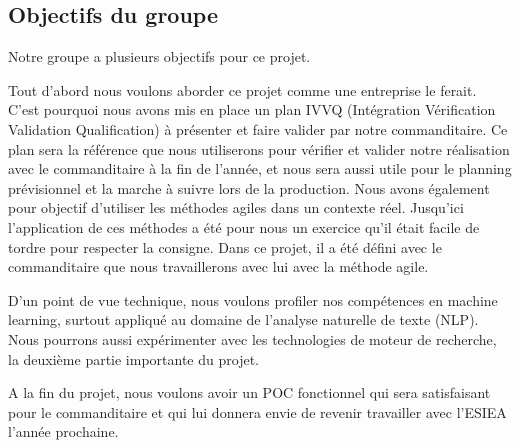 \subsection{Objectifs du groupe}
Notre groupe a plusieurs objectifs pour ce projet.

Tout d'abord nous voulons aborder ce projet comme une entreprise le ferait.
C'est pourquoi nous avons mis en place un plan IVVQ (Intégration Vérification Validation Qualification) à présenter et faire valider par notre commanditaire.
Ce plan sera la référence que nous utiliserons pour vérifier et valider notre réalisation avec le commanditaire à la fin de l'année, et nous sera aussi utile pour le planning prévisionnel et la marche à suivre lors de la production.
Nous avons également pour objectif d'utiliser les méthodes agiles dans un contexte réel.
Jusqu'ici l'application de ces méthodes a été pour nous un exercice qu'il était facile de tordre pour respecter la consigne.
Dans ce projet, il a été défini avec le commanditaire que nous travaillerons avec lui avec la méthode agile.


D'un point de vue technique, nous voulons profiler nos compétences en machine learning, surtout appliqué au domaine de l'analyse naturelle de texte (NLP).
Nous pourrons aussi expérimenter avec les technologies de moteur de recherche, la deuxième partie importante du projet.


A la fin du projet, nous voulons avoir un POC fonctionnel qui sera satisfaisant pour le commanditaire et qui lui donnera envie de revenir travailler avec l'ESIEA l'année prochaine.





